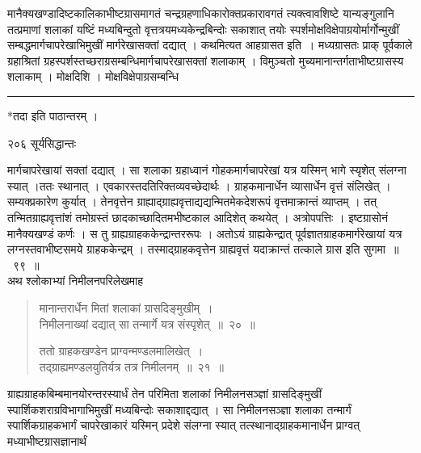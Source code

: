 \documentclass[11pt, openany]{book}
\begin{document}
 मानैक्यखण्डादिष्टकालिकाभीष्टग्रासमागतं चन्द्रग्रहणाधिकारोक्तप्रकारावगतं त्यक्त्वावशिष्टे यान्यङ्गुलानि तत्प्रमाणां शलाकां यष्टिं मध्यबिन्दुतो वृत्तत्रयमध्यकेन्द्रबिन्दोः सकाशात् तयोः स्पर्शमोक्षविक्षेपाग्रयोर्मार्गोन्मुखीं सम्बद्धमार्गचापरेखाभिमुखीं मार्गरेखासक्तां दद्यात् । कथमित्यत आह\textendash ग्रासत इति~। मध्यग्रासतः प्राक् पूर्वकाले ग्रहाश्रितां ग्रहस्पर्शस्तच्छराग्रसम्बन्धिमार्गचापरेखासक्तां शलाकाम् । विमुञ्चतो मुच्यमानान्तर्गताभीष्टग्रासस्य शलाकाम् । मोक्षदिशि । मोक्षविक्षेपाग्रसम्बन्धि\textendash


\noindent\rule{\linewidth}{.5pt}

\begin{center}
 *तदा इति पाठान्तरम् ।
\end{center}

\newpage

\noindent २०६ \hspace{4cm} सूर्यसिद्धान्तः 
\vspace{1cm}



\noindent मार्गचापरेखायां सक्तां दद्यात् । सा शलाका ग्रहाध्वानं गोहकमार्गचापरेखां यत्र यस्मिन् भागे स्यृशेत् संलग्ना स्यात् ।ततः स्थानात् । एवकारस्तदतिरिक्तव्यवच्छेदार्थः । ग्राहकमानार्धेन व्यासार्धेन वृत्तं संलिखेत् । सम्यक्प्रकारेण कुर्यात् । तेनवृत्तेन ग्राह्याद्ग्राह्यवृत्ताद्यद्यन्मितमेकदेशरूपं वृत्तमाक्रान्तं व्याप्तम् । तत् तन्मितग्राह्यवृत्तांशं तमोग्रस्तं छादकाच्छादितमभीष्टकाल आदिशेत् कथयेत् । अत्रोपपत्तिः । इष्टग्रासोनं मानैक्यखण्डं कर्णः । स तु ग्राह्यग्राहककेन्द्रान्तररूपः । अतोऽयं ग्राह्यकेन्द्रात् पूर्वज्ञातग्राहकमार्गरेखायां यत्र लग्नस्तवाभीष्टसमये ग्राहककेन्द्रम् । तस्माद्ग्राहकवृत्तेन ग्राह्यवृत्तं यदाक्रान्तं तत्काले ग्रास इति सुगमा~॥~९९~॥\\
\noindent अथ श्लोकाभ्यां निमीलनपरिलेखमाह\textendash 


\begin{quote}
{\ssi मानान्तरार्धेन मितां शलाकां ग्रासदिङ्मुखीम्~।\\
 निमीलनाख्यां दद्यात् सा तन्मार्गे यत्र संस्पृशेत्~॥~२०~॥

ततो ग्राहकखण्डेन प्राग्वन्मण्डलमालिखेत्~।\\
तद्ग्राह्यमण्डलयुतिर्यत्र तत्र निमीलनम्~॥~२१~॥ }
\end{quote}


 ग्राह्यग्राहकबिम्बमानयोरन्तरस्यार्धं तेन परिमिता शलाकां निमीलनसञ्ज्ञां ग्रासदिङ्मुखीं स्पार्शिकशराग्रविभागाभिमुखीं मध्यबिन्दोः सकाशाद्दद्यात् । सा निमीलनसञ्ज्ञा शलाका तन्मार्गं स्पार्शिकग्राहकभार्गं चापरेखाकारं यस्मिन् प्रदेशे संलग्ना स्यात् तत्स्थानाद्ग्राहकमानार्धेन प्राग्वत् मध्याभीष्टग्रासज्ञानार्थं
\end{document}
